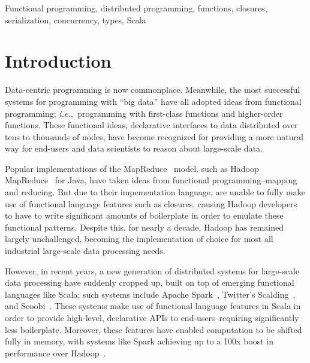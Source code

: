 \documentclass[10pt]{sigplanconf}
\theoremstyle{definition}
\theoremstyle{definition}
\newcommand{\ie}{{\em i.e.,~}}
\begin{document}
\begin{abstract}

\end{abstract}



\keywords
Functional programming, distributed programming, functions, closures,
serialization, concurrency, types, Scala

\section{Introduction}

Data-centric programming is now commonplace. Meanwhile, the most successful
systems for programming with ``big data'' have all adopted ideas from functional
programming; \ie programming with first-class functions and higher-order
functions. These functional ideas, declarative interfaces to data distributed
over tens to thousands of nodes, have become recognized for providing a more
natural way for end-users and data scientists to reason about large-scale data.

Popular implementations of the MapReduce~\cite{MapReduce} model, such as Hadoop
MapReduce~\cite{Hadoop} for Java, have taken ideas from functional
programming--mapping and reducing. But due to their impementation language, are
unable to fully make use of functional language features such as closures,
causing Hadoop developers to have to write significant amounts of boilerplate in
order to emulate these functional patterns. Despite this, for nearly a decade,
Hadoop has remained largely unchallenged, becoming the implementation of choice
for most all industrial large-scale data processing needs.

However, in recent years, a new generation of distributed systems for
large-scale data processing have suddenly cropped up, built on top of emerging
functional languages like Scala; such systems include Apache Spark~\cite{Spark},
Twitter's Scalding~\cite{Scalding}, and Scoobi~\cite{Scoobi}. These systems make
use of functional language features in Scala in order to provide high-level,
declarative APIs to end-users--requiring significantly less boilerplate.
Moreover, these features have enabled computation to be shifted fully in memory,
with systems like Spark achieving up to a 100x boost in performance over
Hadoop~\cite{SparkWebsite}.
\end{document}
